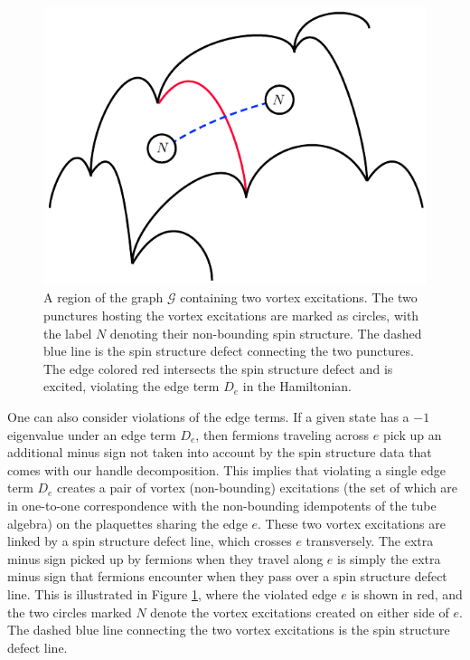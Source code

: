 \documentclass[12pt,a4paper]{article}
\newcommand{\mcg}{\mathcal{G}}
\begin{document}
\begin{figure}
\begin{center}
\includegraphics{graph_with_edge_excitation.pdf}
\caption{\label{lattice_w_vortices} A region of the graph $\mcg$ containing two vortex excitations. 
The two punctures hosting the vortex excitations are marked as circles, with the label $N$ denoting their non-bounding spin structure. 
The dashed blue line is the spin structure defect connecting the two punctures.
The edge colored red intersects the spin structure defect and is excited, violating the edge term $D_e$ in the Hamiltonian. 
}
\end{center}
\end{figure}

One can also consider violations of the edge terms.
If a given state has a $-1$ eigenvalue under an edge term $D_e$, then fermions traveling across $e$ pick up an additional minus sign not taken into account by the spin structure data that comes with our handle decomposition.
This implies that violating a single edge term $D_e$ creates a pair of vortex (non-bounding) excitations (the set of which are in one-to-one correspondence with the non-bounding idempotents of the tube algebra) on the plaquettes sharing the edge $e$. 
These two vortex excitations are linked by a spin structure defect line, which crosses $e$ transversely. 
The extra minus sign picked up by fermions when they travel along $e$ is simply the extra minus sign that fermions encounter when they pass over a spin structure defect line. 
This is illustrated in Figure \ref{lattice_w_vortices}, where the violated edge $e$ is shown in red, and the two circles marked $N$ denote the vortex excitations created on either side of $e$. 
The dashed blue line connecting the two vortex excitations is the spin structure defect line. 
\end{document}
